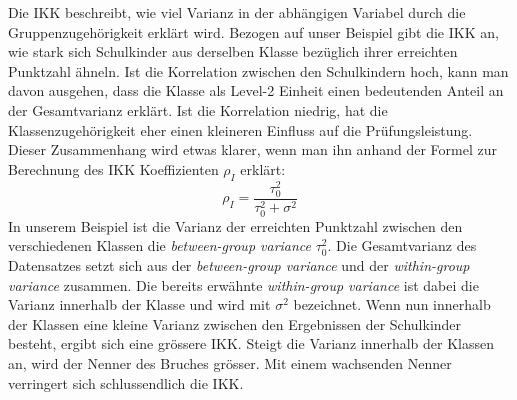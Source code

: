 \documentclass[12pt, a4paper]{article}\usepackage[]{graphicx}\usepackage[]{color}
\begin{document}
Die IKK beschreibt, wie viel Varianz in der abhängigen Variabel durch die Gruppenzugehörigkeit erklärt wird. Bezogen auf unser Beispiel gibt die IKK an, wie stark sich Schulkinder aus derselben Klasse bezüglich ihrer erreichten Punktzahl ähneln. Ist die Korrelation zwischen den Schulkindern hoch, kann man davon ausgehen, dass die Klasse als Level-2 Einheit einen bedeutenden Anteil an der Gesamtvarianz erklärt. Ist die Korrelation niedrig, hat die Klassenzugehörigkeit eher einen kleineren Einfluss auf die Prüfungsleistung. Dieser Zusammenhang wird etwas klarer, wenn man ihn anhand der Formel zur Berechnung des IKK Koeffizienten $\rho_{I}$ erklärt:
\begin{equation} \label{eq:icc}
\rho_{I} = \dfrac{\tau_{0}^{2}}{\tau_{0}^{2} + \sigma^{2}}
\end{equation} 
In unserem Beispiel ist die Varianz der erreichten Punktzahl zwischen den verschiedenen Klassen die \textit{between-group variance} $\tau_{0}^2$. Die Gesamtvarianz des Datensatzes setzt sich aus der \textit{between-group variance} und der \textit{within-group variance} zusammen. Die bereits erwähnte \textit{within-group variance} ist dabei die Varianz innerhalb der Klasse und wird mit $\sigma^2$ bezeichnet. Wenn nun innerhalb der Klassen eine kleine Varianz zwischen den Ergebnissen der Schulkinder besteht, ergibt sich eine grössere IKK. Steigt die Varianz innerhalb der Klassen an, wird der Nenner des Bruches grösser. Mit einem wachsenden Nenner verringert sich schlussendlich die IKK.
\end{document}
